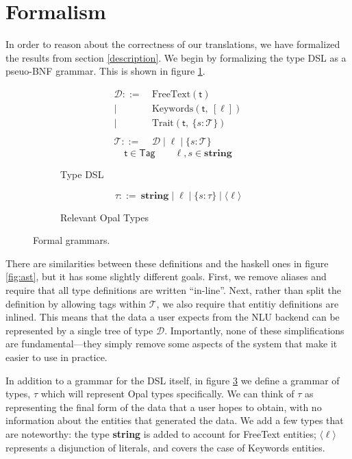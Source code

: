 \documentclass[twocolumn]{article}
\newcommand{\fcy}[1]{\mathcal{#1}}
\newcommand{\etag}[1]{\textsf{#1}}
\begin{document}
\section{Formalism} \label{formalism}
In order to reason about the correctness of our translations, we have formalized
the results from section \ref{description}. We begin by formalizing the type DSL
as a pseuo-BNF grammar. This is shown in figure \ref{fig:grammar_a}.
\begin{figure}
  \centering
  \begin{subfigure}{1\linewidth}
    \begin{align*}
      \fcy{D} ::=&\ \text{FreeText}(\etag{t}) \\
      |&\ \text{Keywords}(\etag{t},\ [\ell]) \\
      |&\ \text{Trait}(\etag{t},\ \{s: \fcy{T}\}) \\
      \\
      \fcy{T} ::=&\ \fcy{D} \mid \ell \mid \{s: \fcy{T}\}
    \end{align*}
    $$ \etag{t} \in \textsf{Tag} \qquad \ell, s \in \textbf{string} $$
    \caption{Type DSL}
    \label{fig:grammar_a}
  \end{subfigure}\vspace{1cm}
  \begin{subfigure}{1\linewidth}
    $$ \tau ::=\ \textbf{string} \mid \ell \mid \{s: \tau\} \mid \langle \ell
    \rangle $$
    \caption{Relevant Opal Types}
    \label{fig:grammar_b}
  \end{subfigure}
  \caption{Formal grammars.}
\end{figure}
There are similarities between these definitions and the haskell ones in figure
\ref{fig:ast}, but it has some slightly different goals. First, we remove
aliases and require that all type definitions are written ``in-line''. Next,
rather than split the definition by allowing tags within $\fcy{T}$, we also
require that entitiy definitions are inlined. This means that the data a user
expects from the NLU backend can be represented by a single tree of type
$\fcy{D}$. Importantly, none of these simplifications are fundamental---they
simply remove some aspects of the system that make it easier to use in practice.

In addition to a grammar for the DSL itself, in figure \ref{fig:grammar_b} we
define a grammar of types, $\tau$ which will represent Opal types specifically.
We can think of $\tau$ as representing the final form of the data that a user
hopes to obtain, with no information about the entities that generated the data.
We add a few types that are noteworthy: the type {\bf string} is added to
account for FreeText entities; $\langle {\ell} \rangle$ represents a disjunction
of literals, and covers the case of Keywords entities.
\end{document}
